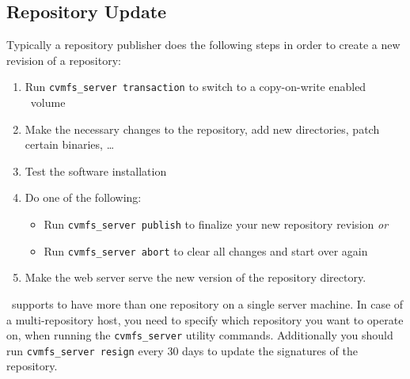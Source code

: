 \subsection{Repository Update}
Typically a repository publisher does the following steps in order to create a new revision of a repository:
\begin{enumerate}
	\item Run \texttt{cvmfs\_server transaction} to switch to a copy-on-write enabled \cvmfs\ volume
	\item Make the necessary changes to the repository, \eg add new directories, patch certain binaries, \dots
	\item Test the software installation
	\item Do one of the following:
	\begin{itemize}
		\item Run \texttt{cvmfs\_server publish} to finalize your new repository revision \emph{or}
		\item Run \texttt{cvmfs\_server abort} to clear all changes and start over again
	\end{itemize}
	\item Make the web server serve the new version of the repository directory.
\end{enumerate}

\cvmfs\ supports to have more than one repository on a single server machine.
In case of a multi-repository host, you need to specify which repository you want to operate on, when running the \texttt{cvmfs\_server} utility commands.
Additionally you should run \texttt{cvmfs\_server resign} every 30 days to update the signatures of the repository.
